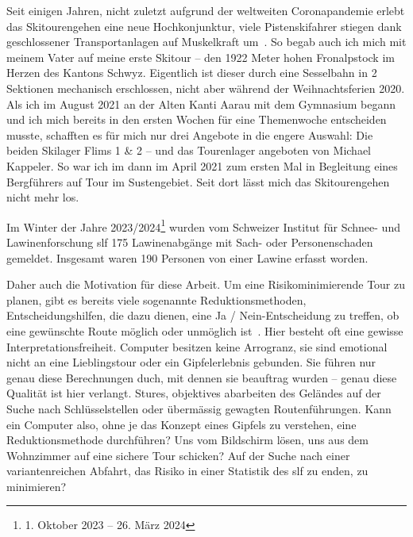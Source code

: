 


Seit einigen Jahren, nicht zuletzt aufgrund der weltweiten Coronapandemie erlebt das Skitourengehen eine neue Hochkonjunktur, viele Pistenskifahrer stiegen dank geschlossener Transportanlagen auf Muskelkraft um~\cite{sacCoronaTrend}. So begab auch ich mich mit meinem Vater auf meine erste Skitour – den 1922 Meter hohen Fronalpstock im Herzen des Kantons Schwyz. Eigentlich ist dieser durch eine Sesselbahn in 2 Sektionen mechanisch erschlossen, nicht aber während der Weihnachtsferien 2020.
Als ich im August 2021 an der Alten Kanti Aarau mit dem Gymnasium begann und ich mich bereits in den ersten Wochen für eine Themenwoche entscheiden musste, schafften es für mich nur drei Angebote in die engere Auswahl: Die beiden Skilager Flims 1 \& 2 – und das Tourenlager angeboten von Michael Kappeler. So war ich im dann im April 2021 zum ersten Mal in Begleitung eines Bergführers auf Tour im Sustengebiet. Seit dort lässt mich das Skitourengehen nicht mehr los.

Im Winter der Jahre 2023/2024\footnote{1. Oktober 2023 -- 26. März 2024} wurden vom Schweizer Institut für Schnee- und Lawinenforschung \gls{slf} 175 Lawinenabgänge mit Sach- oder Personenschaden gemeldet. Insgesamt waren 190 Personen von einer Lawine erfasst worden.~\cite{slfWinterbericht202324}

Daher auch die Motivation für diese Arbeit. Um eine Risikominimierende Tour zu planen, gibt es bereits viele sogenannte Reduktionsmethoden, Entscheidungshilfen, die dazu dienen, eine Ja / Nein-Entscheidung zu treffen, ob eine gewünschte Route möglich oder unmöglich ist~\cite{skitourenguruReduktionsmethoden}.
Hier besteht oft eine gewisse Interpretationsfreiheit. Computer besitzen keine Arrogranz, sie sind emotional nicht an eine Lieblingstour oder ein Gipfelerlebnis gebunden. Sie führen nur genau diese Berechnungen duch, mit dennen sie beauftrag wurden – genau diese Qualität ist hier verlangt. Stures, objektives abarbeiten des Geländes auf der Suche nach Schlüsselstellen oder übermässig gewagten Routenführungen. Kann ein Computer also, ohne je das Konzept eines Gipfels zu verstehen, eine Reduktionsmethode durchführen? Uns vom Bildschirm lösen, uns aus dem Wohnzimmer auf eine sichere Tour schicken? 
Auf der Suche nach einer variantenreichen Abfahrt, das Risiko in einer Statistik des \gls{slf} zu enden, zu minimieren?



